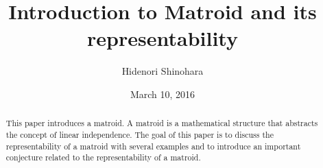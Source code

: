 \documentclass[psamsfonts]{amsart}
\title{Introduction to Matroid and its representability}
\author{Hidenori Shinohara}
\date{March 10, 2016}
\theoremstyle{definition}
\theoremstyle{remark}
\numberwithin{equation}{section}
\begin{document}
\begin{abstract}
This paper introduces a matroid. 
A matroid is a mathematical structure that abstracts the concept of linear independence.
The goal of this paper is to discuss the representability of a matroid with several examples and to introduce an important conjecture related to the representability of a matroid.
\end{abstract}

\maketitle

\tableofcontents










\end{document}
